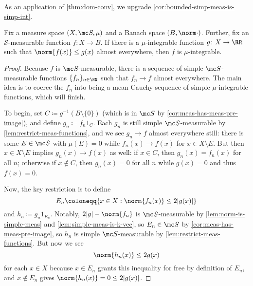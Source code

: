 \documentclass[../notes.tex]{subfiles}
\begin{document}
As an application of \autoref{thm:dom-conv}, we upgrade \autoref{cor:bounded-simp-meas-is-simp-int}.
\begin{corollary}
	Fix a measure space $(X,\mc S,\mu)$ and a Banach space $(B,\norm\cdot)$. Further, fix an $\mathcal S$-measurable function $f\colon X\to B$. If there is a $\mu$-integrable function $g\colon X\to\RR$ such that $\norm{f(x)}\le g(x)$ almost everywhere, then $f$ is $\mu$-integrable.
\end{corollary}
\begin{proof}
	Because $f$ is $\mc S$-measurable, there is a sequence of simple $\mc S$-measurable functions $\{f_n\}_{n\in\NN}$ such that $f_n\to f$ almost everywhere. The main idea is to coerce the $f_n$ into being a mean Cauchy sequence of simple $\mu$-integrable functions, which will finish.
	
	To begin, set $C\coloneqq g^{-1}(B\setminus\{0\})$ (which is in $\mc S$ by \autoref{cor:meas-has-meas-pre-image}), and define $g_n\coloneqq f_n1_C$. Each $g_n$ is still simple $\mc S$-measurable by \autoref{lem:restrict-meas-functions}, and we see $g_n\to f$ almost everywhere still: there is some $E\in\mc S$ with $\mu(E)=0$ while $f_n(x)\to f(x)$ for $x\in X\setminus E$. But then $x\in X\setminus E$ implies $g_n(x)\to f(x)$ as well: if $x\in C$, then $g_n(x)=f_n(x)$ for all $n$; otherwise if $x\notin C$, then $g_n(x)=0$ for all $n$ while $g(x)=0$ and thus $f(x)=0$.
	
	Now, the key restriction is to define
	\[E_n\coloneqq\{x\in X:\norm{f_n(x)}\le2|g(x)|\}\]
	and $h_n\coloneqq g_n1_{E_n}$. Notably, $2|g|-\norm{f_n}$ is $\mc S$-measurable by \autoref{lem:norm-is-simple-meas} and \autoref{lem:simple-meas-is-k-vec}, so $E_n\in\mc S$ by \autoref{cor:meas-has-meas-pre-image}, so $h_n$ is simple $\mc S$-measurable by \autoref{lem:restrict-meas-functions}. But now we see
	\[\norm{h_n(x)}\le2g(x)\]
	for each $x\in X$ because $x\in E_n$ grants this inequality for free by definition of $E_n$, and $x\notin E_n$ gives $\norm{h_n(x)}=0\le2|g(x)|$.
	

\end{proof}
\end{document}
